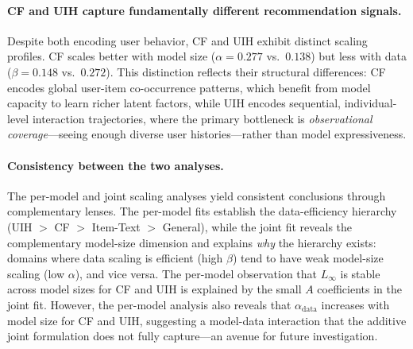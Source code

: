 \documentclass[]{fairmeta}
\begin{document}
  \paragraph{CF and UIH capture fundamentally different recommendation signals.}
  Despite both encoding user behavior, CF and UIH exhibit distinct scaling profiles. CF scales better with model size ($\alpha = 0.277$ vs.\ $0.138$) but less with data ($\beta = 0.148$ vs.\ $0.272$). This distinction reflects their structural differences: CF encodes global user-item
  co-occurrence patterns, which benefit from model capacity to learn richer latent factors, while UIH encodes sequential, individual-level interaction trajectories, where the primary bottleneck is \emph{observational coverage}—seeing enough diverse user histories—rather than model
  expressiveness.

  \paragraph{Consistency between the two analyses.}
  The per-model and joint scaling analyses yield consistent conclusions through complementary lenses. The per-model fits establish the data-efficiency hierarchy (UIH $>$ CF $>$ Item-Text $>$ General), while the joint fit reveals the complementary model-size dimension and explains \emph{why}
  the hierarchy exists: domains where data scaling is efficient (high $\beta$) tend to have weak model-size scaling (low $\alpha$), and vice versa. The per-model observation that $L_\infty$ is stable across model sizes for CF and UIH is explained by the small $A$ coefficients in the joint
  fit. However, the per-model analysis also reveals that $\alpha_{\text{data}}$ increases with model size for CF and UIH, suggesting a model-data interaction that the additive joint formulation does not fully capture—an avenue for future investigation.
\end{document}
